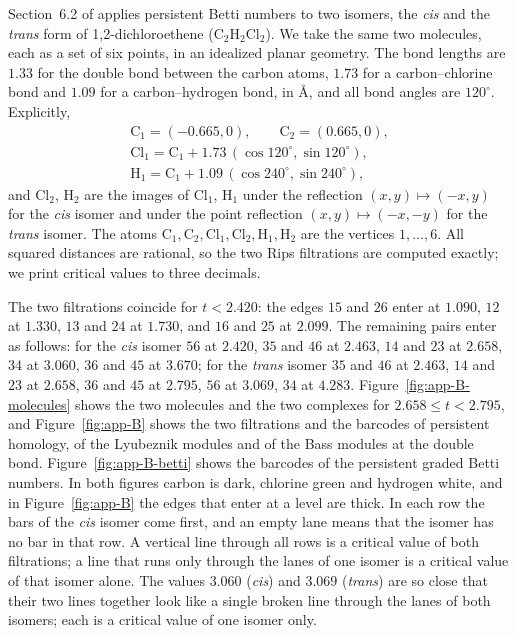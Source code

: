 \documentclass[11pt]{article}
\theoremstyle{plain}
\theoremstyle{definition}
\begin{document}
Section~6.2 of \cite{SuwayyidWeiGraphs} applies persistent Betti numbers to two isomers, the \emph{cis} and the \emph{trans} form of 1,2-dichloroethene ($\mathrm{C_2H_2Cl_2}$). We take the same two molecules, each as a set of six points, in an idealized planar geometry. The bond lengths are $1.33$ for the double bond between the carbon atoms, $1.73$ for a carbon--chlorine bond and $1.09$ for a carbon--hydrogen bond, in \AA, and all bond angles are $120^\circ$. Explicitly,
\begin{gather*}
 \mathrm C_1=(-0.665,0),\qquad \mathrm C_2=(0.665,0),\\
 \mathrm{Cl}_1=\mathrm C_1+1.73\,(\cos120^\circ,\sin120^\circ),\\
 \mathrm H_1=\mathrm C_1+1.09\,(\cos240^\circ,\sin240^\circ),
\end{gather*}
and $\mathrm{Cl}_2$, $\mathrm H_2$ are the images of $\mathrm{Cl}_1$, $\mathrm H_1$ under the reflection $(x,y)\mapsto(-x,y)$ for the \emph{cis} isomer and under the point reflection $(x,y)\mapsto(-x,-y)$ for the \emph{trans} isomer. The atoms $\mathrm C_1,\mathrm C_2,\mathrm{Cl}_1,\mathrm{Cl}_2,\mathrm H_1,\mathrm H_2$ are the vertices $1,\dots,6$. All squared distances are rational, so the two Rips filtrations are computed exactly; we print critical values to three decimals.

The two filtrations coincide for $t<2.420$: the edges $15$ and $26$ enter at $1.090$, $12$ at $1.330$, $13$ and $24$ at $1.730$, and $16$ and $25$ at $2.099$.
The remaining pairs enter as follows: for the \emph{cis} isomer $56$ at $2.420$, $35$ and $46$ at $2.463$, $14$ and $23$ at $2.658$, $34$ at $3.060$, $36$ and $45$ at $3.670$; for the \emph{trans} isomer $35$ and $46$ at $2.463$, $14$ and $23$ at $2.658$, $36$ and $45$ at $2.795$, $56$ at $3.069$, $34$ at $4.283$.
Figure~\ref{fig:app-B-molecules} shows the two molecules and the two complexes for $2.658\le t<2.795$, and Figure~\ref{fig:app-B} shows the two filtrations and the barcodes of persistent homology, of the Lyubeznik modules and of the Bass modules at the double bond. Figure~\ref{fig:app-B-betti} shows the barcodes of the persistent graded Betti numbers. In both figures carbon is dark, chlorine green and hydrogen white, and in Figure~\ref{fig:app-B} the edges that enter at a level are thick. In each row the bars of the \emph{cis} isomer come first, and an empty lane means that the isomer has no bar in that row. A vertical line through all rows is a critical value of both filtrations; a line that runs only through the lanes of one isomer is a critical value of that isomer alone. The values $3.060$ (\emph{cis}) and $3.069$ (\emph{trans}) are so close that their two lines together look like a single broken line through the lanes of both isomers; each is a critical value of one isomer only.
\end{document}
